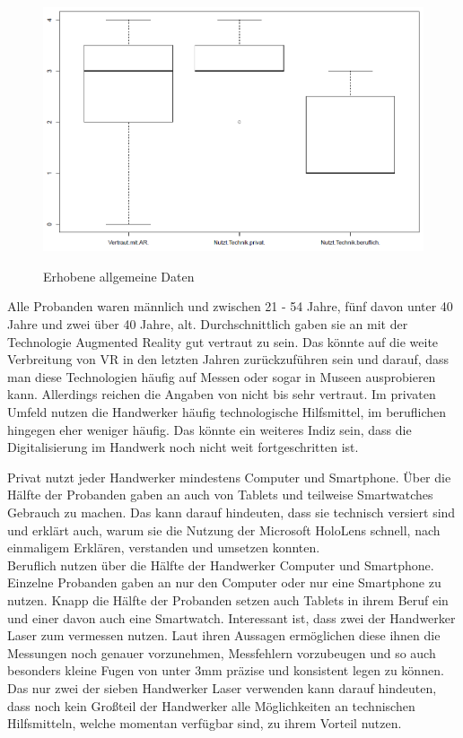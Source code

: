 \begin{figure}[h]
	\begin{center}
		\includegraphics[scale=0.5]{Resources/Evaluation/allgemein.png}
		\label{allgemein}
		\caption{Erhobene allgemeine Daten}	
	\end{center}
\end{figure}

Alle Probanden waren männlich und zwischen 21 - 54 Jahre, fünf davon unter 40 Jahre und zwei über 40 Jahre, alt. Durchschnittlich gaben sie an mit der Technologie Augmented Reality gut vertraut zu sein. Das könnte auf die weite Verbreitung von VR in den letzten Jahren zurückzuführen sein und darauf, dass man diese Technologien häufig auf Messen oder sogar in Museen ausprobieren kann. Allerdings reichen die Angaben von nicht bis sehr vertraut. Im privaten Umfeld nutzen die Handwerker häufig technologische Hilfsmittel, im beruflichen hingegen eher weniger häufig. Das könnte ein weiteres Indiz sein, dass die Digitalisierung im Handwerk noch nicht weit fortgeschritten ist.

Privat nutzt jeder Handwerker mindestens Computer und Smartphone. Über die Hälfte der Probanden gaben an auch von Tablets und teilweise Smartwatches Gebrauch zu machen. Das kann darauf hindeuten, dass sie technisch versiert sind und erklärt auch, warum sie die Nutzung der Microsoft HoloLens schnell, nach einmaligem Erklären, verstanden und umsetzen konnten. \\
Beruflich nutzen über die Hälfte der Handwerker Computer und Smartphone. Einzelne Probanden gaben an nur den Computer oder nur eine Smartphone zu nutzen. Knapp die Hälfte der Probanden setzen auch Tablets in ihrem Beruf ein und einer davon auch eine Smartwatch. Interessant ist, dass zwei der Handwerker Laser zum vermessen nutzen. Laut ihren Aussagen ermöglichen diese ihnen die Messungen noch genauer vorzunehmen, Messfehlern vorzubeugen und so auch besonders kleine Fugen von unter 3mm präzise und konsistent legen zu können. Das nur zwei der sieben Handwerker Laser verwenden kann darauf hindeuten, dass noch kein Großteil der Handwerker alle Möglichkeiten an technischen Hilfsmitteln, welche momentan verfügbar sind, zu ihrem Vorteil nutzen.

